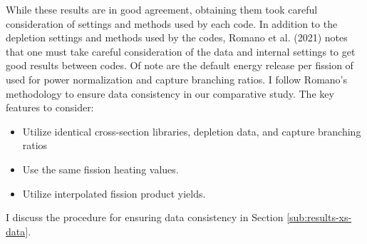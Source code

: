 While these results are in good agreement, obtaining them took careful
consideration of settings and methods used by each code. In addition to the
depletion settings and methods used by the codes,  Romano et al. (2021) notes
that one must take careful consideration of the data and internal settings to
get good results between codes. Of note are the default energy release per
fission of  used for power normalization and capture branching
ratios. I follow Romano's methodology to ensure data consistency in our
comparative study. The key features to consider:
\begin{itemize}
    \item Utilize identical cross-section libraries, depletion data, and capture
    branching ratios
    \item Use the same fission heating values.
    \item Utilize interpolated fission product yields.
\end{itemize}
I discuss the procedure for ensuring data consistency in Section \ref{sub:results-xs-data}.
